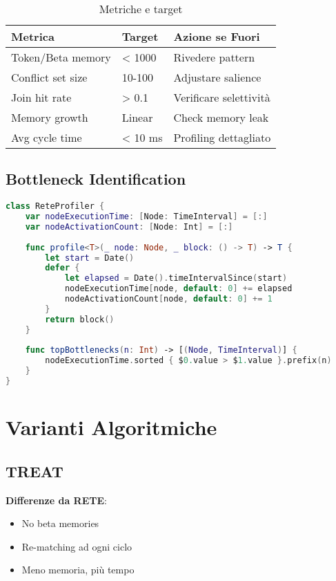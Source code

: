 \begin{table}[h]
\centering
\small
\begin{tabular}{@{}lll@{}}
\toprule
\textbf{Metrica} & \textbf{Target} & \textbf{Azione se Fuori} \\
\midrule
Token/Beta memory & < 1000 & Rivedere pattern \\
Conflict set size & 10-100 & Adjustare salience \\
Join hit rate & > 0.1 & Verificare selettività \\
Memory growth & Linear & Check memory leak \\
Avg cycle time & < 10 ms & Profiling dettagliato \\
\bottomrule
\end{tabular}
\caption{Metriche e target}
\end{table}

\subsection{Bottleneck Identification}

\begin{lstlisting}[language=Swift]
class ReteProfiler {
    var nodeExecutionTime: [Node: TimeInterval] = [:]
    var nodeActivationCount: [Node: Int] = [:]
    
    func profile<T>(_ node: Node, _ block: () -> T) -> T {
        let start = Date()
        defer {
            let elapsed = Date().timeIntervalSince(start)
            nodeExecutionTime[node, default: 0] += elapsed
            nodeActivationCount[node, default: 0] += 1
        }
        return block()
    }
    
    func topBottlenecks(n: Int) -> [(Node, TimeInterval)] {
        nodeExecutionTime.sorted { $0.value > $1.value }.prefix(n)
    }
}
\end{lstlisting}

\section{Varianti Algoritmiche}

\subsection{TREAT}

\textbf{Differenze da RETE}:
\begin{itemize}
\item No beta memories
\item Re-matching ad ogni ciclo
\item Meno memoria, più tempo
\end{itemize}

